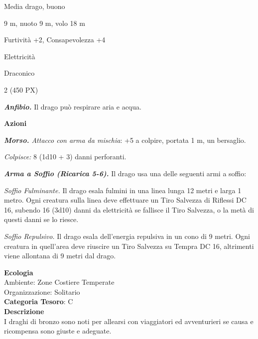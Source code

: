\begin{multicols}{2}
{
\begin{description}[noitemsep, topsep=0pt, parsep=0pt, partopsep=0pt, itemsep=1pt, leftmargin=2.35cm,  labelwidth=2.2cm, itemindent=0cm, listparindent=0pt] %
\setlength{\baselineskip}{10pt}
\item[\textbf{Taglia/Tipo}] Media drago, buono
\item[\textbf{Caratt.}] 
\item[\textbf{Punti Ferita}] 
\item[\textbf{Movimento}] 9 m, nuoto 9 m, volo 18 m
\item[\textbf{Tiri Salvez.}] 
\item[\textbf{Comp.}] Furtività +2, Consapevolezza +4
\item[\textbf{Imm. Danni}] Elettricità
\item[\textbf{Sensi}] 
\item[\textbf{Linguaggi}] Draconico
\item[\textbf{Sfida}] 2 (450 PX)
\end{description}
\smallskip

\emph{\textbf{Anfibio.}} Il drago può respirare aria e acqua.

\textbf{Azioni}

\emph{\textbf{Morso.} Attacco con arma da mischia}: +5 a colpire,
portata 1 m, un bersaglio.

\emph{Colpisce:} 8 (1d10 + 3) danni perforanti.

\emph{\textbf{Arma a Soffio (Ricarica 5-6).}} Il drago usa una delle seguenti armi a soffio:

\emph{Soffio Fulminante.} Il drago esala fulmini in una linea lunga 12 metri e larga 1 metro. Ogni creatura sulla linea deve effettuare un Tiro Salvezza di Riflessi DC 16, subendo 16 (3d10) danni da elettricità se fallisce il Tiro Salvezza, o la metà di questi danni se lo riesce.

\emph{Soffio Repulsivo.} Il drago esala dell'energia repulsiva in un cono di 9 metri. Ogni creatura in quell'area deve riuscire un Tiro Salvezza su Tempra DC 16, altrimenti viene allontana di 9 metri dal drago.

\textbf{Ecologia}\\
Ambiente: Zone Costiere Temperate\\
Organizzazione: Solitario\\
\textbf{Categoria Tesoro}: C\\
\textbf{Descrizione}\\
I draghi di bronzo sono noti per allearsi con viaggiatori ed avventurieri se causa e ricompensa sono giuste e adeguate.

}
\end{multicols}
